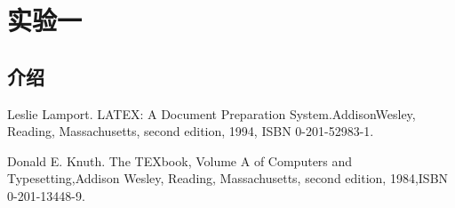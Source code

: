 \documentclass[a4paper,12pt]{report}
\begin{document}
\begin{abstract}
\begin{spacing}{1.5}
    {
    西安交通大学\\[0.5cm]
    \textbf{关键字}：\quad 西安交通大学
    }
\end{spacing}
\end{abstract}

\tableofcontents
\newpage

\chapter{实验一}

\section{介绍}


\begin{thebibliography}{99}
\songti {} 	
Leslie Lamport. LATEX: A Document Preparation System.AddisonWesley, Reading, Massachusetts, second edition, 1994, ISBN 0-201-52983-1.

Donald E. Knuth. The TEXbook, Volume A of Computers and Typesetting,Addison Wesley, Reading, Massachusetts, second edition, 1984,ISBN 0-201-13448-9.
\end{thebibliography}
\end{document}
